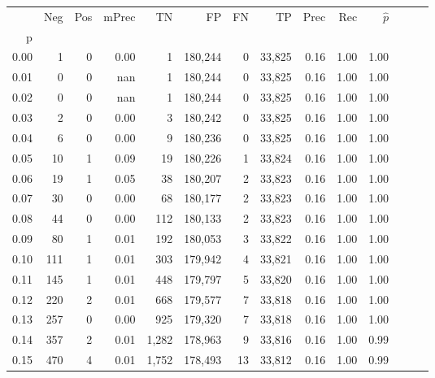 \begin{tabular}{rrrrrrrrrrrrrr}
\toprule
{} &    Neg &    Pos & mPrec &       TN &       FP &      FN &      TP &  Prec &   Rec & $\hat{p}$ \\
p    &        &        &       &          &          &         &         &       &       &           \\
\midrule
0.00 &      1 &      0 &  0.00 &        1 &  180,244 &       0 &  33,825 &  0.16 &  1.00 &      1.00 \\
0.01 &      0 &      0 &   nan &        1 &  180,244 &       0 &  33,825 &  0.16 &  1.00 &      1.00 \\
0.02 &      0 &      0 &   nan &        1 &  180,244 &       0 &  33,825 &  0.16 &  1.00 &      1.00 \\
0.03 &      2 &      0 &  0.00 &        3 &  180,242 &       0 &  33,825 &  0.16 &  1.00 &      1.00 \\
0.04 &      6 &      0 &  0.00 &        9 &  180,236 &       0 &  33,825 &  0.16 &  1.00 &      1.00 \\
0.05 &     10 &      1 &  0.09 &       19 &  180,226 &       1 &  33,824 &  0.16 &  1.00 &      1.00 \\
0.06 &     19 &      1 &  0.05 &       38 &  180,207 &       2 &  33,823 &  0.16 &  1.00 &      1.00 \\
0.07 &     30 &      0 &  0.00 &       68 &  180,177 &       2 &  33,823 &  0.16 &  1.00 &      1.00 \\
0.08 &     44 &      0 &  0.00 &      112 &  180,133 &       2 &  33,823 &  0.16 &  1.00 &      1.00 \\
0.09 &     80 &      1 &  0.01 &      192 &  180,053 &       3 &  33,822 &  0.16 &  1.00 &      1.00 \\
0.10 &    111 &      1 &  0.01 &      303 &  179,942 &       4 &  33,821 &  0.16 &  1.00 &      1.00 \\
0.11 &    145 &      1 &  0.01 &      448 &  179,797 &       5 &  33,820 &  0.16 &  1.00 &      1.00 \\
0.12 &    220 &      2 &  0.01 &      668 &  179,577 &       7 &  33,818 &  0.16 &  1.00 &      1.00 \\
0.13 &    257 &      0 &  0.00 &      925 &  179,320 &       7 &  33,818 &  0.16 &  1.00 &      1.00 \\
0.14 &    357 &      2 &  0.01 &    1,282 &  178,963 &       9 &  33,816 &  0.16 &  1.00 &      0.99 \\
0.15 &    470 &      4 &  0.01 &    1,752 &  178,493 &      13 &  33,812 &  0.16 &  1.00 &      0.99 \\

\end{tabular}
